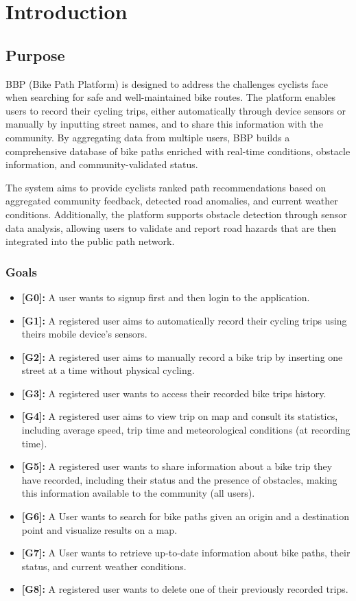 \chapter{Introduction}

\section{Purpose}
BBP (Bike Path Platform) is designed to address the challenges cyclists face when searching for safe and well-maintained bike routes. The platform enables users to record their cycling trips, either automatically through device sensors or manually by inputting street names, and to share this information with the community. By aggregating data from multiple users, BBP builds a comprehensive database of bike paths enriched with real-time conditions, obstacle information, and community-validated status.

The system aims to provide cyclists ranked path recommendations based on aggregated community feedback, detected road anomalies, and current weather conditions. Additionally, the platform supports obstacle detection through sensor data analysis, allowing users to validate and report road hazards that are then integrated into the public path network.

\subsection{Goals}
\begin{itemize}
    \item \textbf{[G0]:} A user wants to signup first and then login to the application.
    \item \textbf{[G1]:} A registered user aims to automatically record their cycling trips using theirs mobile device's sensors. 
    \item \textbf{[G2]:} A registered user aims to manually record a bike trip by inserting one street at a time without physical cycling.
    \item \textbf{[G3]:} A registered user wants to access their recorded bike trips history.
    \item \textbf{[G4]:} A registered user aims to view trip on map and consult its statistics, including average speed, trip time and meteorological conditions (at recording time).
    \item \textbf{[G5]:} A registered user wants to share information about a bike trip they have recorded, including their status and the presence of obstacles, making this information available to the community (all users).
    \item \textbf{[G6]:} A User wants to search for bike paths given an origin and a destination point and visualize results on a map.
    \item \textbf{[G7]:} A User wants to retrieve up-to-date information about bike paths, their status, and current weather conditions.
    \item \textbf{[G8]:} A registered user wants to delete one of their previously recorded trips.
\end{itemize}

